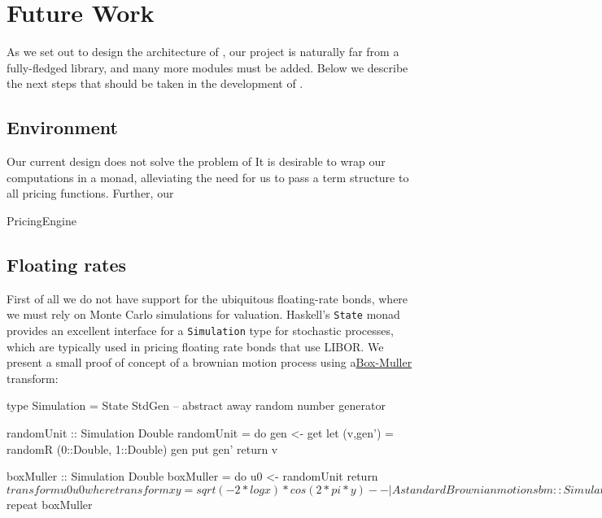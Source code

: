 \chapter{Future Work}

As we set out to design the architecture of \hql, our project is naturally far 
from a fully-fledged library, and many more modules must be added. Below we
describe the next steps that should be taken in the development of \hql.

\section{Environment}

Our current design does not solve the problem of 
It is desirable to wrap our computations in a monad, alleviating the need for
us to pass a term structure to all pricing functions.
Further, our \texttt{}

\begin{hscode}
PricingEngine
\end{hscode}

\section{Floating rates}

First of all we do not have support for the ubiquitous floating-rate bonds, 
where we must rely on Monte Carlo simulations for valuation. Haskell's 
\texttt{State} monad provides an excellent interface for a \texttt{Simulation}
type for stochastic processes, which are typically used in pricing floating
rate bonds that use LIBOR. We present a small proof of concept of a brownian
motion process using a\href{http://en.wikipedia.org/wiki/Box%E2%80%93Muller_transform}{Box-Muller} transform:


\begin{hscode}
type Simulation = State StdGen -- abstract away random number generator

randomUnit :: Simulation Double
randomUnit = do
               gen <- get
               let (v,gen') = randomR (0::Double, 1::Double) gen
               put gen'
               return v

boxMuller :: Simulation Double
boxMuller = do
  u0 <- randomUnit
  return $ transform u0 u0
  where transform x y = sqrt(-2*log x)*cos(2*pi*y)

-- | A standard Brownian motion
sbm :: Simulation [Double]
sbm = sequence $ repeat boxMuller
\end{hscode}

